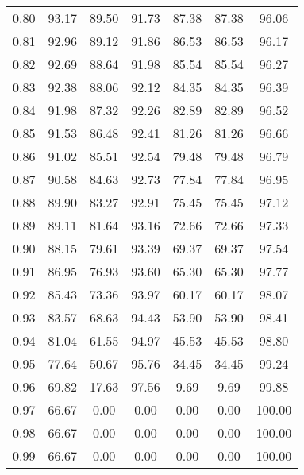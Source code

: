\begin{tabular}{|c|c|c|c|c|c|c|}
      0.80 &     93.17 &     89.50 &      91.73 &   87.38 &      87.38 &         96.06 \\
      0.81 &     92.96 &     89.12 &      91.86 &   86.53 &      86.53 &         96.17 \\
      0.82 &     92.69 &     88.64 &      91.98 &   85.54 &      85.54 &         96.27 \\
      0.83 &     92.38 &     88.06 &      92.12 &   84.35 &      84.35 &         96.39 \\
      0.84 &     91.98 &     87.32 &      92.26 &   82.89 &      82.89 &         96.52 \\
      0.85 &     91.53 &     86.48 &      92.41 &   81.26 &      81.26 &         96.66 \\
      0.86 &     91.02 &     85.51 &      92.54 &   79.48 &      79.48 &         96.79 \\
      0.87 &     90.58 &     84.63 &      92.73 &   77.84 &      77.84 &         96.95 \\
      0.88 &     89.90 &     83.27 &      92.91 &   75.45 &      75.45 &         97.12 \\
      0.89 &     89.11 &     81.64 &      93.16 &   72.66 &      72.66 &         97.33 \\
      0.90 &     88.15 &     79.61 &      93.39 &   69.37 &      69.37 &         97.54 \\
      0.91 &     86.95 &     76.93 &      93.60 &   65.30 &      65.30 &         97.77 \\
      0.92 &     85.43 &     73.36 &      93.97 &   60.17 &      60.17 &         98.07 \\
      0.93 &     83.57 &     68.63 &      94.43 &   53.90 &      53.90 &         98.41 \\
      0.94 &     81.04 &     61.55 &      94.97 &   45.53 &      45.53 &         98.80 \\
      0.95 &     77.64 &     50.67 &      95.76 &   34.45 &      34.45 &         99.24 \\
      0.96 &     69.82 &     17.63 &      97.56 &    9.69 &       9.69 &         99.88 \\
      0.97 &     66.67 &      0.00 &       0.00 &    0.00 &       0.00 &        100.00 \\
      0.98 &     66.67 &      0.00 &       0.00 &    0.00 &       0.00 &        100.00 \\
      0.99 &     66.67 &      0.00 &       0.00 &    0.00 &       0.00 &        100.00 \\
\bottomrule
\end{tabular}
